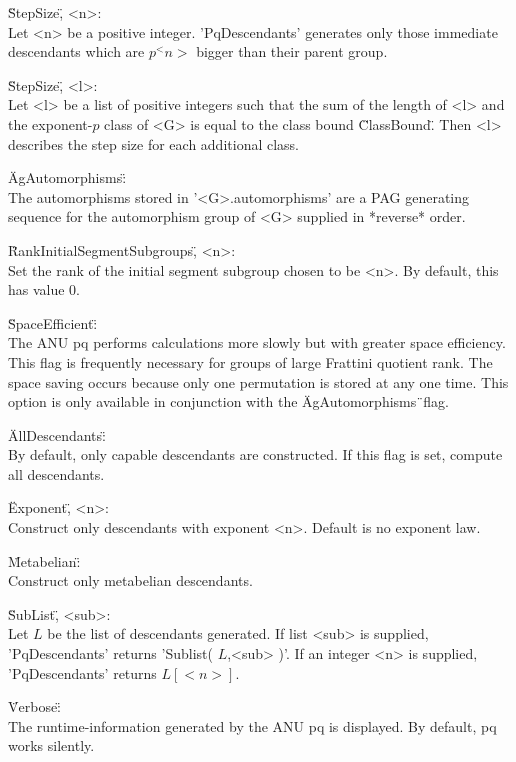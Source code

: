 \"StepSize\", <n>: \\
    Let <n> be a  positive integer.  'PqDescendants' generates only those
    immediate  descendants  which are $p^<n>$  bigger  than  their parent
    group.

\"StepSize\", <l>: \\
    Let <l> be a  list of  positive  integers such that  the  sum  of the
    length of <l> and the exponent-$p$ class of <G> is equal to the class
    bound \"ClassBound\".  Then  <l> describes  the  step size  for  each
    additional class.

\"AgAutomorphisms\": \\
    The automorphisms stored in '<G>.automorphisms' are  a PAG generating
    sequence for  the  automorphism group  of  <G> supplied in  *reverse*
    order.

\"RankInitialSegmentSubgroups\", <n>: \\
    Set the rank  of the  initial  segment  subgroup chosen to  be <n>.
    By default, this has value 0.

\"SpaceEfficient\": \\
    The ANU  pq performs  calculations  more slowly but with greater space
    efficiency.
    This  flag is  frequently  necessary  for  groups of  large  Frattini
    quotient rank.  The space  saving occurs because only one permutation
    is  stored at  any  one  time.   This option  is  only  available  in
    conjunction with the \"AgAutomorphisms\"\ flag.

\"AllDescendants\": \\
    By default, only capable descendants are constructed. If this flag
    is set, compute all descendants.

\"Exponent\", <n>: \\
    Construct only descendants with exponent <n>.  Default is no exponent
    law.

\"Metabelian\": \\
    Construct only metabelian descendants.

\"SubList\", <sub>: \\
    Let $L$  be  the  list of  descendants  generated.  If  list <sub> is
    supplied,  'PqDescendants'  returns  'Sublist( $L$,<sub> )'.  If   an
    integer <n> is supplied, 'PqDescendants' returns $L[<n>]$.

\"Verbose\": \\
    The runtime-information  generated by  the  ANU pq is  displayed.  By
    default, pq works silently.


